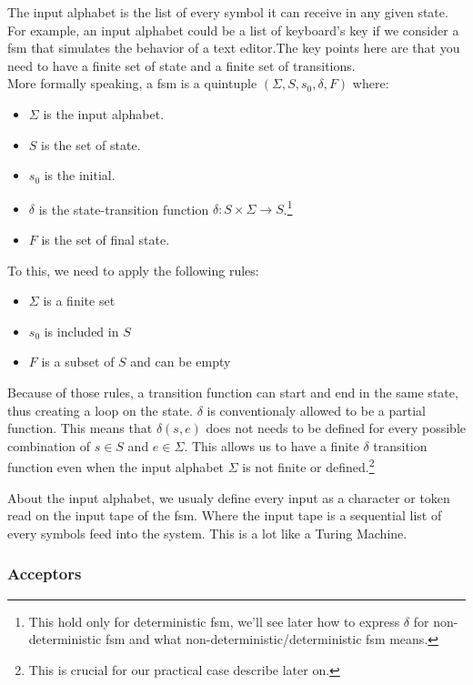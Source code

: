 \documentclass[12pt]{article}
\begin{document}
The input alphabet is the list of every symbol it can receive in any given state. For example, an input alphabet could be a list of keyboard's key if we consider a \gls{fsm} that simulates the behavior of a text editor.The key points here are that you need to have a finite set of state and a finite set of transitions.\\

More formally speaking, a \gls{fsm} is a quintuple $(\Sigma, S, s_{0},\delta, F)$ where:

\begin{itemize}
\item $\Sigma$ is the input alphabet.
\item $S$ is the set of state.
\item $s_{0}$ is the initial.
\item $\delta$ is the state-transition function $\delta:S\times \Sigma \rightarrow S$.\footnote{This hold only for deterministic \gls{fsm}, we'll see later how to express $\delta$ for non-deterministic \gls{fsm} and what non-deterministic/deterministic \gls{fsm} means.}
\item $F$ is the set of final state.
\end{itemize}

To this, we need to apply the following rules:

\begin{itemize}
\item $\Sigma$ is a finite set
\item $s_{0}$ is included in $S$
\item $F$ is a subset of $S$ and can be empty
\end{itemize}

Because of those rules, a transition function can start and end in the same state, thus creating a loop on the state. $\delta$ is conventionaly allowed to be a partial function. This means that $\delta(s, e)$ does not needs to be defined for every possible combination of $s \in S$ and $e \in \Sigma$. This allows us to have a finite $\delta$ transition function even when the input alphabet $\Sigma$ is not finite or defined.\footnote{This is crucial for our practical case describe later on.}

About the input alphabet, we usualy define every input as a character or token read on the input tape of the \gls{fsm}. Where the input tape is a sequential list of every symbols feed into the system. This is a lot like a Turing Machine.

\subsubsection{Acceptors}
\end{document}
